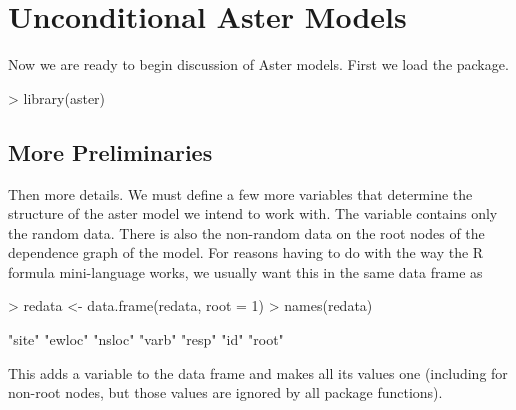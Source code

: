 \documentclass[11pt]{article}
\begin{document}
\section{Unconditional Aster Models}

Now we are ready to begin discussion of Aster models.
First we load the package.
\begin{Schunk}
\begin{Sinput}
> library(aster)
\end{Sinput}
\end{Schunk}

\subsection{More Preliminaries}

Then more details.  We must define a few more variables that determine
the structure of the aster model we intend to work with.  The variable
\verb@resp@ contains only the random data.  There is also the non-random
data on the root nodes of the dependence graph of the model.  For reasons
having to do with the way the R formula mini-language works, we usually
want this in the same data frame as \verb@resp@
\begin{Schunk}
\begin{Sinput}
> redata <- data.frame(redata, root = 1)
> names(redata)
\end{Sinput}
\begin{Soutput}
[1] "site"  "ewloc" "nsloc" "varb"  "resp"  "id"    "root" 
\end{Soutput}
\end{Schunk}
This adds a variable \verb@root@ to the data frame and makes all its values
one (including for non-root nodes, but those values are ignored by
all \verb@aster@ package functions).
\end{document}
